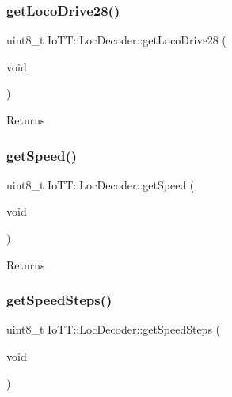 \subsubsection{\texorpdfstring{get\+Loco\+Drive28()}{getLocoDrive28()}}
{\footnotesize\ttfamily uint8\+\_\+t Io\+T\+T\+::\+Loc\+Decoder\+::get\+Loco\+Drive28 (\begin{DoxyParamCaption}\item[{void}]{ }\end{DoxyParamCaption})}

\begin{DoxyReturn}{Returns}

\end{DoxyReturn}
\mbox{\label{classIoTT_1_1LocDecoder_aaa19e16c24db209d24f30e4698da7f31}} 
\subsubsection{\texorpdfstring{get\+Speed()}{getSpeed()}}
{\footnotesize\ttfamily uint8\+\_\+t Io\+T\+T\+::\+Loc\+Decoder\+::get\+Speed (\begin{DoxyParamCaption}\item[{void}]{ }\end{DoxyParamCaption})}

\begin{DoxyReturn}{Returns}

\end{DoxyReturn}
\mbox{\label{classIoTT_1_1LocDecoder_aa1472d19a65a0e329d2e64ad0acd6764}} 
\subsubsection{\texorpdfstring{get\+Speed\+Steps()}{getSpeedSteps()}}
{\footnotesize\ttfamily uint8\+\_\+t Io\+T\+T\+::\+Loc\+Decoder\+::get\+Speed\+Steps (\begin{DoxyParamCaption}\item[{void}]{ }\end{DoxyParamCaption})}

